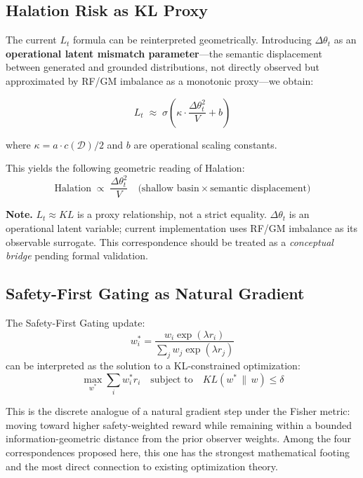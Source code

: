 \documentclass[11pt,a4paper]{article}
\begin{document}
\subsection{Halation Risk as KL Proxy}

The current $L_t$ formula can be reinterpreted geometrically.
Introducing $\Delta\theta_t$ as an \textbf{operational latent mismatch parameter}---the
semantic displacement between generated and grounded distributions,
not directly observed but approximated by RF/GM imbalance as a monotonic proxy---we obtain:

\begin{equation}
L_t \;\approx\; \sigma\!\left(\kappa \cdot \frac{\Delta\theta_t^2}{V} + b\right)
\label{eq:lt_geo}
\end{equation}

where $\kappa = a \cdot c(\mathcal{D})/2$ and $b$ are operational scaling constants.

This yields the following geometric reading of Halation:
\begin{equation}
\text{Halation} \;\propto\; \frac{\Delta\theta_t^2}{V}
\quad\text{(shallow basin} \times \text{semantic displacement)}
\end{equation}

\textbf{Note.}
$L_t \approx KL$ is a proxy relationship, not a strict equality.
$\Delta\theta_t$ is an operational latent variable; current implementation
uses RF/GM imbalance as its observable surrogate.
This correspondence should be treated as a \textit{conceptual bridge} pending formal validation.

\subsection{Safety-First Gating as Natural Gradient}

The Safety-First Gating update:
\begin{equation}
w_i^* = \frac{w_i \exp(\lambda r_i)}{\sum_j w_j \exp(\lambda r_j)}
\end{equation}
can be interpreted as the solution to a KL-constrained optimization:
\begin{equation}
\max_{w^*} \sum_i w_i^* r_i
\quad \text{subject to} \quad KL(w^* \,\|\, w) \leq \delta
\end{equation}

This is the discrete analogue of a natural gradient step under the Fisher metric:
moving toward higher safety-weighted reward while remaining within a bounded
information-geometric distance from the prior observer weights.
Among the four correspondences proposed here, this one has the strongest
mathematical footing and the most direct connection to existing optimization theory.
\end{document}
